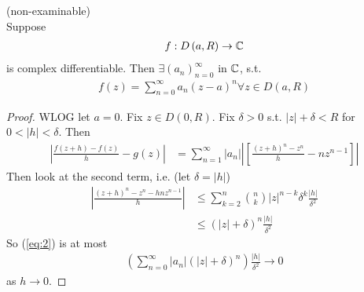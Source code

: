 \documentclass[a4paper]{article}
\begin{document}
\begin{thm}(non-examinable)\\
Suppose
\begin{equation*}
\begin{aligned}
f: D\left(a,R\right) \to \mathbb{C}
\end{aligned}
\end{equation*}
is complex differentiable. Then $\exists \left(a_n\right)_{n=0}^\infty$ in $\mathbb{C}$, s.t.
\begin{equation*}
\begin{aligned}
f\left(z\right) = \sum_{n=0}^\infty a_n \left(z-a\right)^n \forall z\in D\left(a,R\right)
\end{aligned}
\end{equation*}
\begin{proof}
WLOG let $a=0$. Fix $z\in D\left(0,R\right)$. Fix $\delta >0$ s.t. $|z|+\delta < R$ for $0<|h| < \delta$. Then
\begin{equation}\label{eq:2}
\begin{aligned}
|\frac{f\left(z+h\right)-f\left(z\right)}{h} - g\left(z\right)| &= \sum_{n=1}^\infty |a_n| |\left[\frac{\left(z+h\right)^n-z^n}{h} - nz^{n-1}\right]|
\end{aligned}
\end{equation}
Then look at the second term, i.e. (let $\delta = |h|$)
\begin{equation*}
\begin{aligned}
|\frac{\left(z+h\right)^n-z^n-hnz^{n-1}}{h}| &\leq \sum_{k=2}^n {n \choose k} |z|^{n-k} \delta^{k}\frac{|h|}{\delta^2}\\
&\leq \left(|z|+\delta\right)^n \frac{|h|}{\delta^2}
\end{aligned}
\end{equation*}
So (\ref{eq:2}) is at most
\begin{equation*}
\begin{aligned}
\left(\sum_{n=0}^\infty |a_n| \left(|z|+\delta\right)^n\right) \frac{|h|}{\delta^2}\to 0
\end{aligned}
\end{equation*}
as $h\to 0$.
\end{proof}
\end{thm}
\end{document}
